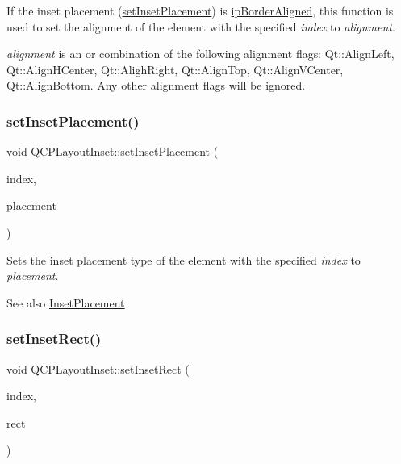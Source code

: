 If the inset placement (\hyperlink{classQCPLayoutInset_a63298830744d5d8c5345511c00fd2144}{set\+Inset\+Placement}) is \hyperlink{classQCPLayoutInset_a8b9e17d9a2768293d2a7d72f5e298192aa81e7df4a785ddee2229a8f47c46e817}{ip\+Border\+Aligned}, this function is used to set the alignment of the element with the specified {\itshape index} to {\itshape alignment}.

{\itshape alignment} is an or combination of the following alignment flags\+: Qt\+::\+Align\+Left, Qt\+::\+Align\+H\+Center, Qt\+::\+Aligh\+Right, Qt\+::\+Align\+Top, Qt\+::\+Align\+V\+Center, Qt\+::\+Align\+Bottom. Any other alignment flags will be ignored. \mbox{\label{classQCPLayoutInset_a63298830744d5d8c5345511c00fd2144}} 
\subsubsection{\texorpdfstring{set\+Inset\+Placement()}{setInsetPlacement()}}
{\footnotesize\ttfamily void Q\+C\+P\+Layout\+Inset\+::set\+Inset\+Placement (\begin{DoxyParamCaption}\item[{int}]{index,  }\item[{\hyperlink{classQCPLayoutInset_a8b9e17d9a2768293d2a7d72f5e298192}{Q\+C\+P\+Layout\+Inset\+::\+Inset\+Placement}}]{placement }\end{DoxyParamCaption})}

Sets the inset placement type of the element with the specified {\itshape index} to {\itshape placement}.

\begin{DoxySeeAlso}{See also}
\hyperlink{classQCPLayoutInset_a8b9e17d9a2768293d2a7d72f5e298192}{Inset\+Placement} 
\end{DoxySeeAlso}
\mbox{\label{classQCPLayoutInset_aa487c8378a6f9533567a2e6430099dc3}} 
\subsubsection{\texorpdfstring{set\+Inset\+Rect()}{setInsetRect()}}
{\footnotesize\ttfamily void Q\+C\+P\+Layout\+Inset\+::set\+Inset\+Rect (\begin{DoxyParamCaption}\item[{int}]{index,  }\item[{const Q\+RectF \&}]{rect }\end{DoxyParamCaption})}

